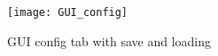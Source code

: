 \begin{figure}[H]
	\centering
	\texttt{[image: GUI\_config]}
	\caption{GUI config tab with save and loading}
	\label{fig:GUI_config}
\end{figure}






